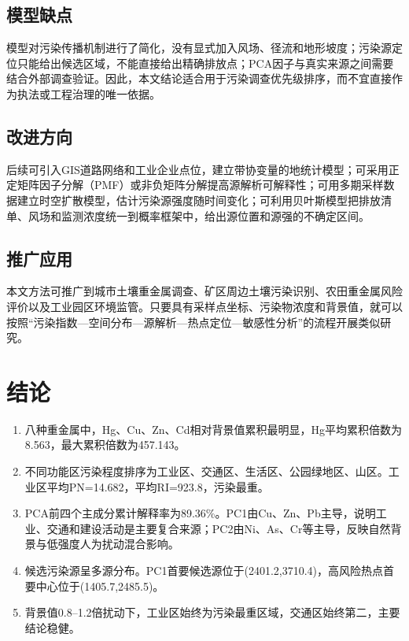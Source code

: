 \documentclass[UTF8,a4paper,12pt]{ctexart}
\begin{document}
\subsection{模型缺点}
模型对污染传播机制进行了简化，没有显式加入风场、径流和地形坡度；污染源定位只能给出候选区域，不能直接给出精确排放点；PCA因子与真实来源之间需要结合外部调查验证。因此，本文结论适合用于污染调查优先级排序，而不宜直接作为执法或工程治理的唯一依据。

\subsection{改进方向}
后续可引入GIS道路网络和工业企业点位，建立带协变量的地统计模型；可采用正定矩阵因子分解（PMF）或非负矩阵分解提高源解析可解释性；可用多期采样数据建立时空扩散模型，估计污染源强度随时间变化；可利用贝叶斯模型把排放清单、风场和监测浓度统一到概率框架中，给出源位置和源强的不确定区间。

\subsection{推广应用}
本文方法可推广到城市土壤重金属调查、矿区周边土壤污染识别、农田重金属风险评价以及工业园区环境监管。只要具有采样点坐标、污染物浓度和背景值，就可以按照“污染指数—空间分布—源解析—热点定位—敏感性分析”的流程开展类似研究。

\section{结论}
\begin{enumerate}
\item 八种重金属中，Hg、Cu、Zn、Cd相对背景值累积最明显，Hg平均累积倍数为8.563，最大累积倍数为457.143。
\item 不同功能区污染程度排序为工业区、交通区、生活区、公园绿地区、山区。工业区平均PN=14.682，平均RI=923.8，污染最重。
\item PCA前四个主成分累计解释率为89.36\%。PC1由Cu、Zn、Pb主导，说明工业、交通和建设活动是主要复合来源；PC2由Ni、As、Cr等主导，反映自然背景与低强度人为扰动混合影响。
\item 候选污染源呈多源分布。PC1首要候选源位于(2401.2,3710.4)，高风险热点首要中心位于(1405.7,2485.5)。
\item 背景值0.8--1.2倍扰动下，工业区始终为污染最重区域，交通区始终第二，主要结论稳健。
\end{enumerate}
\end{document}
